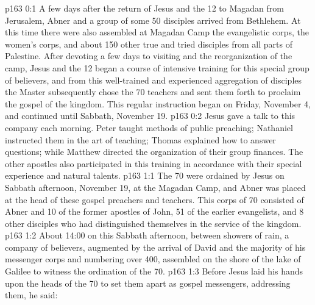 \author{Midwayer Commission}
\vs p163 0:1 A few days after the return of Jesus and the 12 to Magadan from Jerusalem, Abner and a group of some 50 disciples arrived from Bethlehem. At this time there were also assembled at Magadan Camp the evangelistic corps, the women’s corps, and about 150 other true and tried disciples from all parts of Palestine. After devoting a few days to visiting and the reorganization of the camp, Jesus and the 12 began a course of intensive training for this special group of believers, and from this well\hyp{}trained and experienced aggregation of disciples the Master subsequently chose the 70 teachers and sent them forth to proclaim the gospel of the kingdom. This regular instruction began on Friday, November 4, and continued until Sabbath, November 19.
\vs p163 0:2 Jesus gave a talk to this company each morning. Peter taught methods of public preaching; Nathaniel instructed them in the art of teaching; Thomas explained how to answer questions; while Matthew directed the organization of their group finances. The other apostles also participated in this training in accordance with their special experience and natural talents.
\vs p163 1:1 The 70 were ordained by Jesus on Sabbath afternoon, November 19, at the Magadan Camp, and Abner was placed at the head of these gospel preachers and teachers. This corps of 70 consisted of Abner and 10 of the former apostles of John, 51 of the earlier evangelists, and 8 other disciples who had distinguished themselves in the service of the kingdom.
\vs p163 1:2 About 14:00 on this Sabbath afternoon, between showers of rain, a company of believers, augmented by the arrival of David and the majority of his messenger corps and numbering over 400, assembled on the shore of the lake of Galilee to witness the ordination of the 70.
\vs p163 1:3 Before Jesus laid his hands upon the heads of the 70 to set them apart as gospel messengers, addressing them, he said: 
